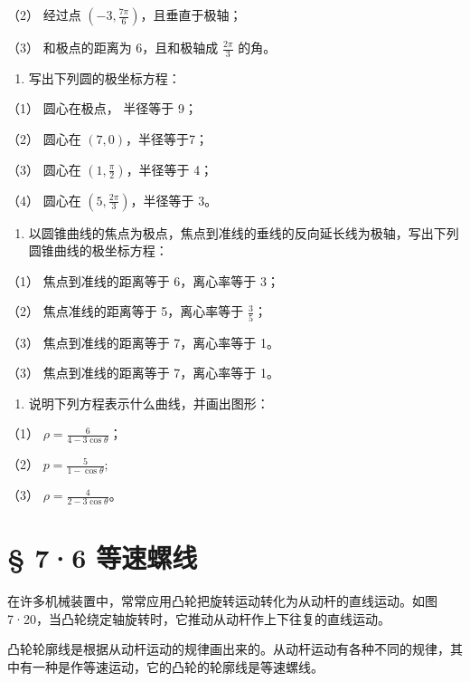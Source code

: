 （2） 经过点 \(\left(-3, \frac{7\pi}{6}\right)\)，且垂直于极轴；

（3） 和极点的距离为 6，且和极轴成 \(\frac{2\pi}{3}\) 的角。

\begin{enumerate}
\def\labelenumi{\arabic{enumi}.}
\setcounter{enumi}{1}
\tightlist
\item
  写出下列圆的极坐标方程：
\end{enumerate}

（1） 圆心在极点， 半径等于 9；

（2） 圆心在 \((7,0)\)，半径等于7；

（3） 圆心在 \(\left(1, \frac{\pi}{2}\right)\)，半径等于 4；

（4） 圆心在 \(\left(5, \frac{2\pi}{3}\right)\)，半径等于 3。

\begin{enumerate}
\def\labelenumi{\arabic{enumi}.}
\setcounter{enumi}{2}
\tightlist
\item
  以圆锥曲线的焦点为极点，焦点到准线的垂线的反向延长线为极轴，写出下列圆锥曲线的极坐标方程：
\end{enumerate}

（1） 焦点到准线的距离等于 6，离心率等于 3；

（2） 焦点准线的距离等于 5，离心率等于 \(\frac{3}{5}\)；

（3） 焦点到准线的距离等于 7，离心率等于 1。

（3） 焦点到准线的距离等于 7，离心率等于 1。

\begin{enumerate}
\def\labelenumi{\arabic{enumi}.}
\setcounter{enumi}{3}
\tightlist
\item
  说明下列方程表示什么曲线，并画出图形：
\end{enumerate}

（1） \(\rho = \frac{6}{4 - 3\cos\theta}\)；

（2） \(p = \frac{5}{1 - \cos\theta};\)

（3） \(\rho = \frac{4}{2 - 3\cos\theta}\)。

\section{§ 7·6 等速螺线}\label{ux7b49ux901fux87baux7ebf}

在许多机械装置中，常常应用凸轮把旋转运动转化为从动杆的直线运动。如图7·20，当凸轮绕定轴旋转时，它推动从动杆作上下往复的直线运动。

凸轮轮廓线是根据从动杆运动的规律画出来的。从动杆运动有各种不同的规律，其中有一种是作等速运动，它的凸轮的轮廓线是等速螺线。

